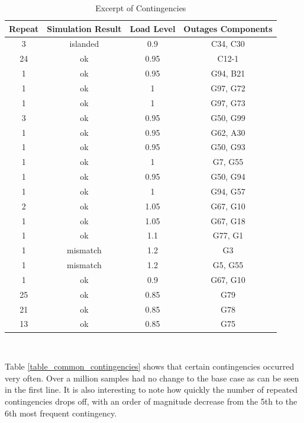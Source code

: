 \documentclass[a4paper,oneside,12pt]{report}
\begin{document}
\begin{table}[htbp]
\caption{Excerpt of Contingencies}
\label{table_contingencies}
\centering
\begin{tabular}{c||c||c||c}
\bfseries Repeat & \bfseries Simulation Result & \bfseries Load Level & \bfseries Outages Components \\
\hline \hline
3 & islanded & 0.9 & C34, C30 \\ 
24 & ok & 0.95 & C12-1  \\ 
1 & ok & 0.95 & G94, B21 \\ 
1 & ok & 1 & G97, G72 \\ 
1 & ok & 1 & G97, G73 \\ 
3 & ok & 0.95 & G50, G99 \\ 
1 & ok & 0.95 & G62, A30 \\ 
1 & ok & 0.95 & G50, G93 \\ 
1 & ok & 1 & G7, G55 \\ 
1 & ok & 0.95 & G50, G94 \\ 
1 & ok & 1 & G94, G57 \\ 
2 & ok & 1.05 & G67, G10 \\ 
1 & ok & 1.05 & G67, G18 \\ 
1 & ok & 1.1 & G77, G1 \\ 
1 & mismatch & 1.2 & G3  \\ 
1 & mismatch & 1.2 & G5, G55 \\ 
1 & ok & 0.9 & G67, G10 \\ 
25 & ok & 0.85 & G79  \\ 
21 & ok & 0.85 & G78  \\ 
13 & ok & 0.85 & G75  \\ 
\hline
\end{tabular}\\
\end{table}

Table \ref{table_common_contingencies} shows that certain contingencies occurred very often. Over a million samples had no change to the base case as can be seen in the first line. It is also interesting to note how quickly the number of repeated contingencies drops off, with an order of magnitude decrease from the 5th to the 6th most frequent contingency.
\end{document}

